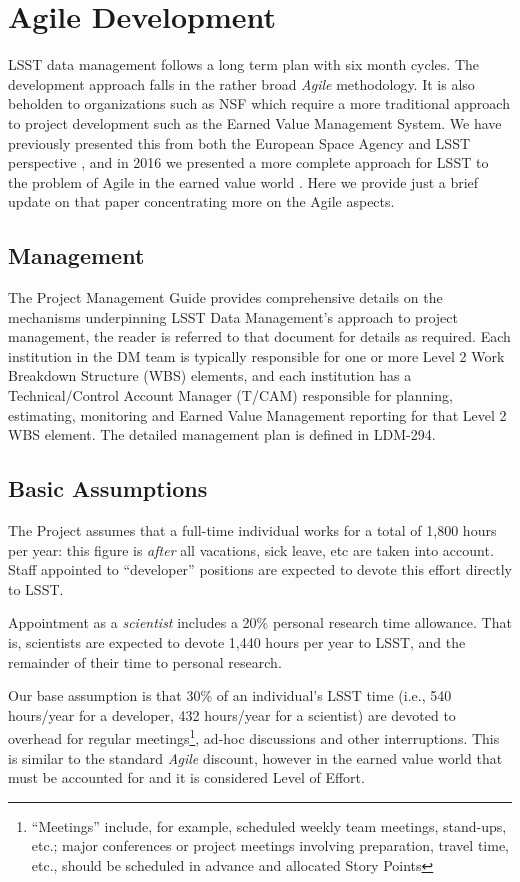 \section{Agile Development}\label{sec:agile}

LSST data management follows a long term plan with six month cycles. The  development approach falls in the rather broad \emph{Agile} methodology.
It is also beholden to organizations such as NSF which require a more traditional approach to project development such as the Earned Value Management System.
We have previously presented this from both the European Space Agency and LSST perspective \cite{2014SPIE.9150E..1EG}, and in 2016 we presented a more complete approach for LSST to the problem of Agile in the earned value world \cite{2016SPIE.9911E..0NK}.
Here we provide just a brief update on that paper concentrating more on the Agile aspects.


\subsection{Management}
The Project Management Guide \cite{DMTN-020} provides  comprehensive details on the mechanisms underpinning LSST Data Management’s approach to project management, the reader is referred to that document for details as required.
Each institution in the DM team is typically responsible for one or more Level 2 Work Breakdown Structure (WBS) elements, and each institution has a Technical/Control Account Manager (T/CAM) responsible for planning, estimating, monitoring and Earned Value Management reporting for that Level 2 WBS element.
The detailed management plan is defined in LDM-294\cite{LDM-294}.

\subsection{Basic Assumptions}
The Project assumes that a full-time individual works for a total of
1,800 hours per year: this figure is \emph{after} all vacations, sick
leave, etc are taken into account. Staff appointed to ``developer''
positions are expected to devote this effort directly to LSST.

Appointment as a \emph{scientist} includes a 20\% personal research time
allowance. That is, scientists are expected to devote 1,440 hours per
year to LSST, and the remainder of their time to personal research.

Our base assumption is that 30\% of an individual's LSST time (i.e., 540 hours/year for a developer, 432 hours/year for a scientist) are devoted to overhead for regular meetings\footnote{``Meetings'' include, for example, scheduled weekly team meetings, stand-ups, etc.; major conferences or project meetings involving preparation, travel time, etc., should be scheduled in advance and allocated Story Points}, ad-hoc discussions and other interruptions.
This is similar to the standard \emph{Agile} discount, however in the earned value world that must be accounted for and it is considered Level of Effort.


